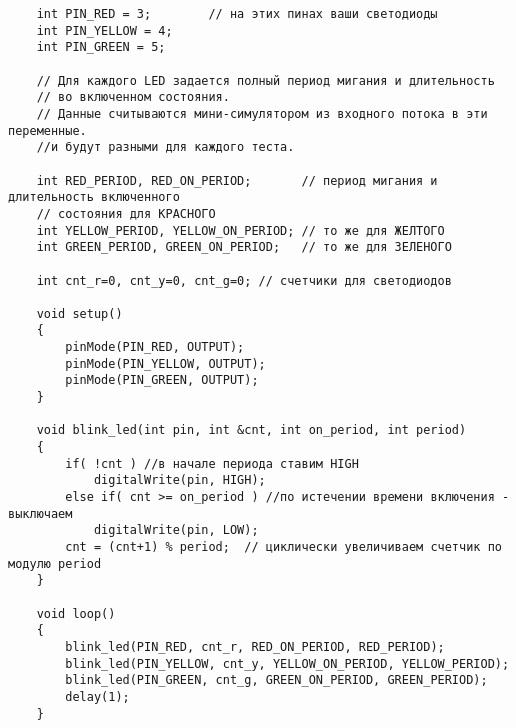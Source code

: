 \codeExample

\begin{verbatim}
    int PIN_RED = 3;        // на этих пинах ваши светодиоды
    int PIN_YELLOW = 4;
    int PIN_GREEN = 5;

    // Для каждого LED задается полный период мигания и длительность 
    // во включенном состояния.
    // Данные считываются мини-симулятором из входного потока в эти переменные. 
    //и будут разными для каждого теста.

    int RED_PERIOD, RED_ON_PERIOD;       // период мигания и длительность включенного 
    // состояния для КРАСНОГО
    int YELLOW_PERIOD, YELLOW_ON_PERIOD; // то же для ЖЕЛТОГО
    int GREEN_PERIOD, GREEN_ON_PERIOD;   // то же для ЗЕЛЕНОГО 
    
    int cnt_r=0, cnt_y=0, cnt_g=0; // счетчики для светодиодов

    void setup()
    {
        pinMode(PIN_RED, OUTPUT); 
        pinMode(PIN_YELLOW, OUTPUT); 
        pinMode(PIN_GREEN, OUTPUT);
    }

    void blink_led(int pin, int &cnt, int on_period, int period)
    {
        if( !cnt ) //в начале периода ставим HIGH
            digitalWrite(pin, HIGH); 
        else if( cnt >= on_period ) //по истечении времени включения - выключаем
            digitalWrite(pin, LOW);    
        cnt = (cnt+1) % period;  // циклически увеличиваем счетчик по модулю period
    }    

    void loop()
    {
        blink_led(PIN_RED, cnt_r, RED_ON_PERIOD, RED_PERIOD);
        blink_led(PIN_YELLOW, cnt_y, YELLOW_ON_PERIOD, YELLOW_PERIOD);
        blink_led(PIN_GREEN, cnt_g, GREEN_ON_PERIOD, GREEN_PERIOD);
        delay(1);
    }
\end{verbatim}